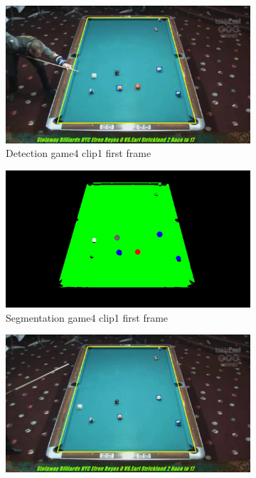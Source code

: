 \begin{figure}[H]
    \centering
    \begin{subfigure}[b]{0.48\textwidth}
        \centering
        \includegraphics[width=\textwidth]{images/Detection/game4_clip1_detected_balls_first_frame.jpg}
        \caption{Detection game4 clip1 first frame}
        \label{fig: game4_clip1_first_frame_detected}
    \end{subfigure}
    \begin{subfigure}[b]{0.48\textwidth}
        \centering
        \includegraphics[width=\textwidth]{images/Segmentation/game4_clip1_segmented_balls_first_frame.jpg}
        \caption{Segmentation game4 clip1 first frame}
		\label{fig: game4_clip1_first_frame_segmented}
    \end{subfigure}
    \begin{subfigure}[b]{0.48\textwidth}
        \centering
        \includegraphics[width=\textwidth]{images/Detection/game4_clip1_detected_balls_last_frame.jpg}

\end{subfigure}
\end{figure}
